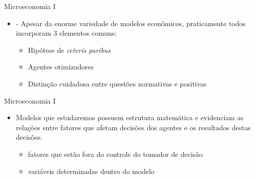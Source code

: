 \documentclass[10pt]{beamer}
\begin{document}
\begin{frame}{Microeconomia I}
    \begin{itemize}
        \item {} - Apesar da enorme variedade de modelos econômicos, praticamente todos incorporam 3 elementos comuns:\medskip
        \begin{itemize}
            \item Hipótese de \emph{ceteris paribus}\medskip
            \medskip
            \item Agentes otimizadores\medskip
            \item Distinção cuidadosa entre questões normativas e positivas\bigskip
        \end{itemize}        
    \end{itemize}
\end{frame}

\begin{frame}{Microeconomia I}
    \begin{itemize}
        \item Modelos que estudaremos possuem estrutura matemática e evidenciam as relações entre fatores que afetam decisões dos agentes e os resultados destas decisões.\bigskip
        \begin{itemize}
            \item {} fatores que estão fora do controle do tomador de decisão \medskip
            \item {} variáveis determinadas dentro do modelo
        \end{itemize}
    \end{itemize}
\end{frame}
\end{document}
